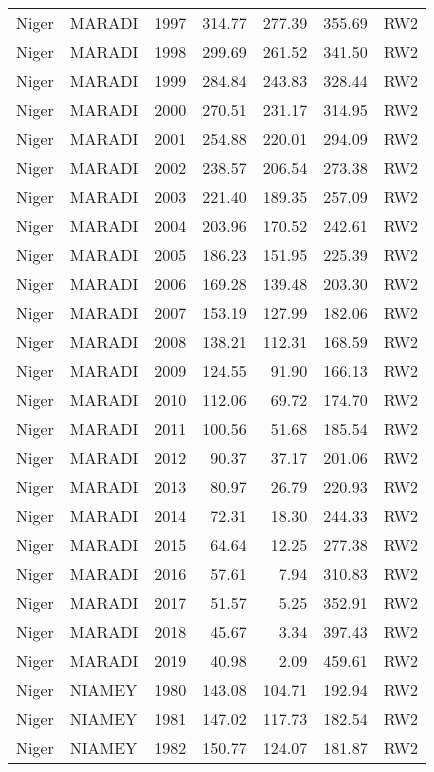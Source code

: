 \begin{longtable}{lllrrrl}
  Niger & MARADI & 1997 & 314.77 & 277.39 & 355.69 & RW2 \\ 
  Niger & MARADI & 1998 & 299.69 & 261.52 & 341.50 & RW2 \\ 
  Niger & MARADI & 1999 & 284.84 & 243.83 & 328.44 & RW2 \\ 
  Niger & MARADI & 2000 & 270.51 & 231.17 & 314.95 & RW2 \\ 
  Niger & MARADI & 2001 & 254.88 & 220.01 & 294.09 & RW2 \\ 
  Niger & MARADI & 2002 & 238.57 & 206.54 & 273.38 & RW2 \\ 
  Niger & MARADI & 2003 & 221.40 & 189.35 & 257.09 & RW2 \\ 
  Niger & MARADI & 2004 & 203.96 & 170.52 & 242.61 & RW2 \\ 
  Niger & MARADI & 2005 & 186.23 & 151.95 & 225.39 & RW2 \\ 
  Niger & MARADI & 2006 & 169.28 & 139.48 & 203.30 & RW2 \\ 
  Niger & MARADI & 2007 & 153.19 & 127.99 & 182.06 & RW2 \\ 
  Niger & MARADI & 2008 & 138.21 & 112.31 & 168.59 & RW2 \\ 
  Niger & MARADI & 2009 & 124.55 & 91.90 & 166.13 & RW2 \\ 
  Niger & MARADI & 2010 & 112.06 & 69.72 & 174.70 & RW2 \\ 
  Niger & MARADI & 2011 & 100.56 & 51.68 & 185.54 & RW2 \\ 
  Niger & MARADI & 2012 & 90.37 & 37.17 & 201.06 & RW2 \\ 
  Niger & MARADI & 2013 & 80.97 & 26.79 & 220.93 & RW2 \\ 
  Niger & MARADI & 2014 & 72.31 & 18.30 & 244.33 & RW2 \\ 
  Niger & MARADI & 2015 & 64.64 & 12.25 & 277.38 & RW2 \\ 
  Niger & MARADI & 2016 & 57.61 & 7.94 & 310.83 & RW2 \\ 
  Niger & MARADI & 2017 & 51.57 & 5.25 & 352.91 & RW2 \\ 
  Niger & MARADI & 2018 & 45.67 & 3.34 & 397.43 & RW2 \\ 
  Niger & MARADI & 2019 & 40.98 & 2.09 & 459.61 & RW2 \\ 
  Niger & NIAMEY & 1980 & 143.08 & 104.71 & 192.94 & RW2 \\ 
  Niger & NIAMEY & 1981 & 147.02 & 117.73 & 182.54 & RW2 \\ 
  Niger & NIAMEY & 1982 & 150.77 & 124.07 & 181.87 & RW2 \\ 

\end{longtable}
